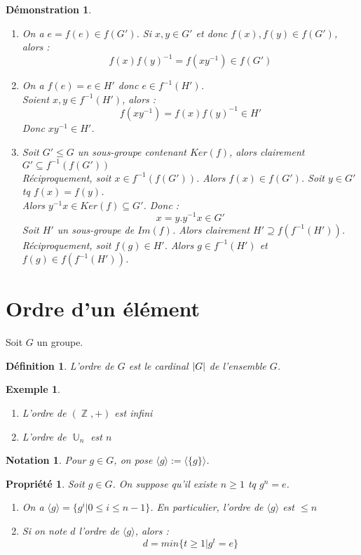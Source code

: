 \documentclass[a4paper, oneside]{report}
\theoremstyle{break}
\newtheorem{defi}[thm]{Définition}
\newtheorem{propr}[thm]{Propriété}
\newtheorem{nota}[thm]{Notation}
\newtheorem{exem}[thm]{Exemple}
\newtheorem*{demo}{Démonstration}
\DeclareMathOperator{\Z}{\mathbb{Z}}
\DeclareMathOperator{\U}{\mathbb{U}}
\DeclarePairedDelimiter\abs{\lvert}{\rvert}%
\begin{document}
\begin{demo}
	\begin{enumerate}
		\item On a $e=f(e)\in f(G')$. Si $x,y\in G'$ et donc $f(x),f(y)\in f(G')$, alors :
		$$f(x)f(y)^{-1}=f(xy^{-1})\in f(G')$$
		
		\item On a $f(e)=e \in H'$ donc $e\in f^{-1}(H')$.\\
		Soient $x,y\in f^{-1}(H')$, alors :
		$$f(xy^{-1})=f(x)f(y)^{-1} \in H'$$
		Donc $xy^{-1}\in H'$.
		
		\item Soit $G'\leq G$ un sous-groupe contenant $Ker(f)$, alors clairement $G'\subseteq f^{-1}(f(G'))$\\
		Réciproquement, soit $x\in f^{-1}(f(G'))$. Alors $f(x)\in f(G')$. Soit $y\in G'$ tq $f(x)=f(y)$.\\
		Alors $y^{-1}x\in Ker(f)\subseteq G'$. Donc :
		$$x = y.y^{-1}x \in G'$$
		Soit $H'$ un sous-groupe de $Im(f)$. Alors clairement $H'\supseteq f(f^{-1}(H'))$.\\
		Réciproquement, soit $f(g)\in H'$. Alors $g\in f^{-1}(H')$ et $f(g)\in f(f^{-1}(H'))$.
	\end{enumerate}
\end{demo}

\section{Ordre d'un élément}
Soit $G$ un groupe.\\

\begin{defi}
	L'ordre de $G$ est le cardinal $\abs{G}$ de l'ensemble $G$.
\end{defi}

\begin{exem}
	\begin{enumerate}
		\item L'ordre de $(\Z,+)$ est infini
		\item L'ordre de $\U_n$ est $n$
	\end{enumerate}
\end{exem}

\begin{nota}
	Pour $g\in G$, on pose $\langle g\rangle := \langle\{ g \}\rangle$.
\end{nota}

\begin{propr}
	Soit $g\in G$. On suppose qu'il existe $n\geq 1$ tq $g^n=e$.
	\begin{enumerate}
		\item On a $\langle g\rangle = \{g^i | 0\leq i \leq n-1 \}$. En particulier, l'ordre de $\langle g\rangle$ est $\leq n$
		\item Si on note $d$ l'ordre de $\langle g\rangle$, alors :
		$$d=min\{t\geq 1 | g^t=e \}$$
	\end{enumerate}
\end{propr}
\end{document}
